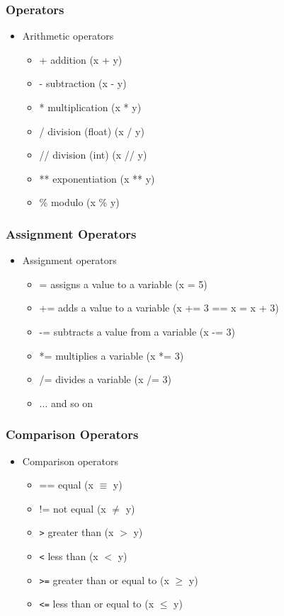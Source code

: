\documentclass{beamer}
\begin{document}
\begin{frame}
  \frametitle{Operators}
  \begin{itemize}
    \item Arithmetic operators
    \begin{itemize}
      \item + addition (x + y)
      \item - subtraction (x - y)
      \item * multiplication (x * y)
      \item / division (float) (x / y)
      \item // division (int) (x // y)
      \item ** exponentiation (x ** y)
      \item \% modulo (x \% y)
    \end{itemize}
  \end{itemize}
\end{frame}
\begin{frame}
  \frametitle{Assignment Operators}
  \begin{itemize}
    \item Assignment operators
    \begin{itemize}
      \item = assigns a value to a variable (x = 5)
      \item += adds a value to a variable (x += 3 == x = x + 3)
      \item -= subtracts a value from a variable (x -= 3)
      \item *= multiplies a variable (x *= 3)
      \item /= divides a variable (x /= 3)
      \item ... and so on 
    \end{itemize}
  \end{itemize}
\end{frame}

\begin{frame}
  \frametitle{Comparison Operators}
  \begin{itemize}
    \item Comparison operators
    \begin{itemize}
      \item == equal (x $\equiv$ y)
      \item != not equal (x $\neq$ y)
      \item \texttt{>} greater than (x $>$ y)
      \item \texttt{<} less than (x $<$ y)
      \item \texttt{>=} greater than or equal to (x $\geq$ y)
      \item \texttt{<=} less than or equal to (x $\leq$ y)
    \end{itemize}
  \end{itemize}
\end{frame}
\end{document}
